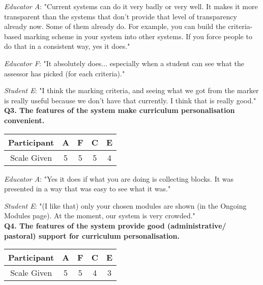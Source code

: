 \textit{Educator A}: "Current systems can do it very badly or very well. It makes it more transparent than
the systems that don't provide that level of transparency already now. Some of them already do. For example,
you can build the criteria-based marking scheme in your system into other systems. If you force people to do that
in a consistent way, yes it does."

\textit{Educator F}: "It absolutely does...
especially when a student can see what the assessor has picked (for each criteria)."

\textit{Student E}: "I think the marking criteria, and seeing what we got from the marker is really useful 
because we don't have that currently. I think that is really good."\\

\textbf{Q3. The features of the system make curriculum personalisation convenient.}\\
\begin{table}[!ht]
	\centering
	\begin{tabularx}{0.325\textwidth}{|c|c|c|c|c|}
		\hline
		Participant & A                  & F                  & C                  & E \\
		\hline
		Scale Given & \cellcolor{green}5 & \cellcolor{green}5 & \cellcolor{green}5 & \cellcolor{SpringGreen}4 \\
		\hline
	\end{tabularx}
\end{table}

\textit{Educator A}: "Yes it does if what you are doing is collecting blocks. It was presented in a way that was
easy to see what it was."

\textit{Student E}: "(I like that) only your chosen modules are shown (in the Ongoing Modules page). At the moment, our system is very crowded."\\

\textbf{Q4. The features of the system provide good (administrative/ pastoral) support for curriculum personalisation.}\\
\begin{table}[!ht]
	\centering
	\begin{tabularx}{0.325\textwidth}{|c|c|c|c|c|}
		\hline
		Participant & A                  & F                  & C                  & E \\
		\hline
		Scale Given & \cellcolor{green}5 & \cellcolor{green}5 & \cellcolor{SpringGreen}4 & \cellcolor{Dandelion}3 \\
		\hline
	\end{tabularx}
\end{table}

